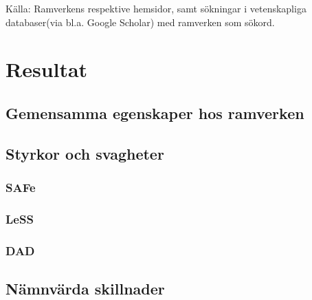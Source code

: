 Källa: Ramverkens respektive hemsidor\cite{dad_web, less_web, safe_web}, samt sökningar i vetenskapliga databaser(via bl.a. Google Scholar) med ramverken som sökord.



\newpage

\section{Resultat}




\subsection{Gemensamma egenskaper hos ramverken}



\subsection{Styrkor och svagheter}

\subsubsection{SAFe}



\subsubsection{LeSS}

\subsubsection{DAD}

\subsection{Nämnvärda skillnader}
